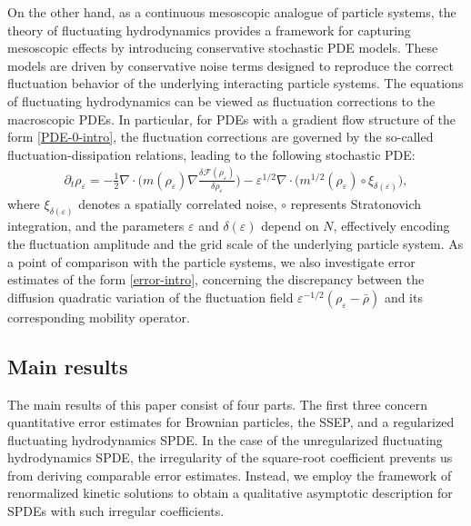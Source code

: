 \documentclass[UTF-8,reqno]{amsart}
\numberwithin{equation}{section}
\begin{document}
On the other hand, as a continuous mesoscopic analogue of particle systems, the theory of fluctuating hydrodynamics provides a framework for capturing mesoscopic effects by introducing conservative stochastic PDE models. These models are driven by conservative noise terms designed to reproduce the correct fluctuation behavior of the underlying interacting particle systems. The equations of fluctuating hydrodynamics can be viewed as fluctuation corrections to the macroscopic PDEs. In particular, for PDEs with a gradient flow structure of the form \eqref{PDE-0-intro}, the fluctuation corrections are governed by the so-called fluctuation-dissipation relations, leading to the following stochastic PDE:
\begin{align}
\partial_t\rho_{\varepsilon}=-\frac{1}{2}\nabla\cdot\Big(m(\rho_{\varepsilon})\nabla\frac{\delta\mathcal{F}(\rho_{\varepsilon})}{\delta\rho_{\varepsilon}}\Big)-\varepsilon^{1/2}\nabla\cdot\Big(m^{1/2}(\rho_{\varepsilon})\circ\xi_{\delta(\varepsilon)}\Big),
\end{align}
where $\xi_{\delta(\varepsilon)}$ denotes a spatially correlated noise, $\circ$ represents Stratonovich integration, and the parameters $\varepsilon$ and $\delta(\varepsilon)$ depend on $N$, effectively encoding the fluctuation amplitude and the grid scale of the underlying particle system. As a point of comparison with the particle systems, we also investigate error estimates of the form \eqref{error-intro}, concerning the discrepancy between the diffusion quadratic variation of the fluctuation field $\varepsilon^{-1/2}(\rho_{\varepsilon} - \bar{\rho})$ and its corresponding mobility operator. 

\subsection{Main results} 
The main results of this paper consist of four parts. The first three concern quantitative error estimates for Brownian particles, the SSEP, and a regularized fluctuating hydrodynamics SPDE. In the case of the unregularized fluctuating hydrodynamics SPDE, the irregularity of the square-root coefficient prevents us from deriving comparable error estimates. Instead, we employ the framework of renormalized kinetic solutions to obtain a qualitative asymptotic description for SPDEs with such irregular coefficients.
\end{document}
